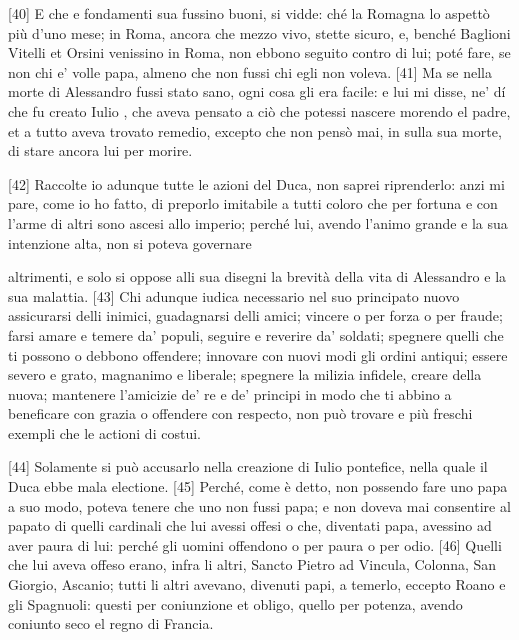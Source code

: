 {[}40{]} E che e fondamenti sua fussino buoni, si vidde: ché la Romagna
lo aspettò più d'uno mese; in Roma, ancora che mezzo vivo, stette
sicuro, e, benché Baglioni Vitelli et Orsini venissino in Roma, non
ebbono seguito contro di lui; poté fare, se non chi e' volle papa,
almeno che non fussi chi egli non voleva. {[}41{]} Ma se nella morte di
Alessandro fussi stato sano, ogni cosa gli era facile: e lui mi disse,
ne' dí che fu creato Iulio , che aveva pensato a ciò che potessi
nascere morendo el padre, et a tutto aveva trovato remedio, excepto che
non pensò mai, in sulla sua morte, di stare ancora lui per morire.

{[}42{]} Raccolte io adunque tutte le azioni del Duca, non saprei
riprenderlo: anzi mi pare, come io ho fatto, di preporlo imitabile a
tutti coloro che per fortuna e con l'arme di altri sono ascesi allo
imperio; perché lui, avendo l'animo grande e la sua intenzione alta, non
si poteva governare \linebreak

\quebra

\noindent{}altrimenti, e solo si oppose alli sua disegni la
brevità della vita di Alessandro e la sua malattia. {[}43{]} Chi adunque
iudica necessario nel suo principato nuovo assicurarsi delli inimici,
guadagnarsi delli amici; vincere o per forza o per fraude; farsi amare e
temere da' populi, seguire e reverire da' soldati; spegnere quelli che
ti possono o debbono offendere; innovare con nuovi modi gli ordini
antiqui; essere severo e grato, magnanimo e liberale; spegnere la
milizia infidele, creare della nuova; mantenere l'amicizie de' re e de'
principi in modo che ti abbino a beneficare con grazia o offendere con
respecto, non può trovare e più freschi exempli che le actioni di
costui.

{[}44{]} Solamente si può accusarlo nella creazione di Iulio pontefice,
nella quale il Duca ebbe mala electione. {[}45{]} Perché, come è detto,
non possendo fare uno papa a suo modo, poteva tenere che uno non fussi
papa; e non doveva mai consentire al papato di quelli cardinali che lui
avessi offesi o che, diventati papa, avessino ad aver paura di lui:
perché gli uomini offendono o per paura o per odio. {[}46{]} Quelli che
lui aveva offeso erano, infra li altri, Sancto Pietro ad Vincula,
Colonna, San Giorgio, Ascanio; tutti li altri avevano, divenuti papi, a
temerlo, eccepto Roano e gli Spagnuoli: questi per coniunzione et
obligo, quello per potenza, avendo coniunto seco el regno di Francia.

\quebra


